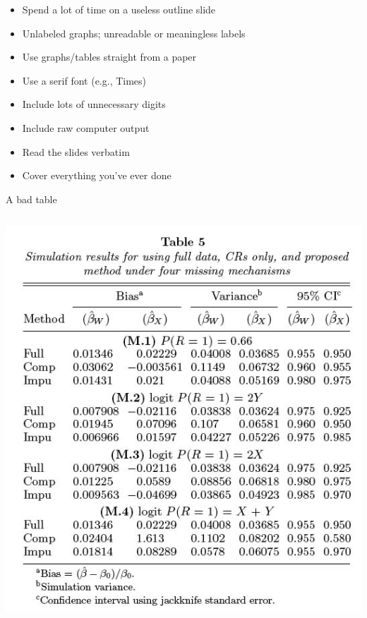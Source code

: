 \documentclass[12pt]{article}
\newcommand{\headsize}{\fontsize{35}{35} \selectfont}
\newcommand{\smallsize}{\fontsize{25}{30} \selectfont}
\begin{document}
\hfill \begin{minipage}{9.5in}

\begin{itemize}
\itemsep18pt
\color{myblue}
\item Spend a lot of time on a useless outline slide

\item Unlabeled graphs; unreadable or meaningless labels

\item Use graphs/tables straight from a paper

\item Use a serif font (e.g., Times)

\color{mywhite}

\item Include lots of unnecessary digits
\color{myblue}

\item Include raw computer output

\item Read the slides verbatim
\item Cover everything you've ever done

\end{itemize}

\end{minipage}


\newpage

\headsize \color{myyellow}
\hfill \begin{minipage}{5.75in}
\centering
A bad table
\end{minipage}

\vspace{30mm} \color{mywhite} \smallsize

\centerline{\includegraphics[height=6in]{Figs/paik_tab5.jpg}}
\end{document}
